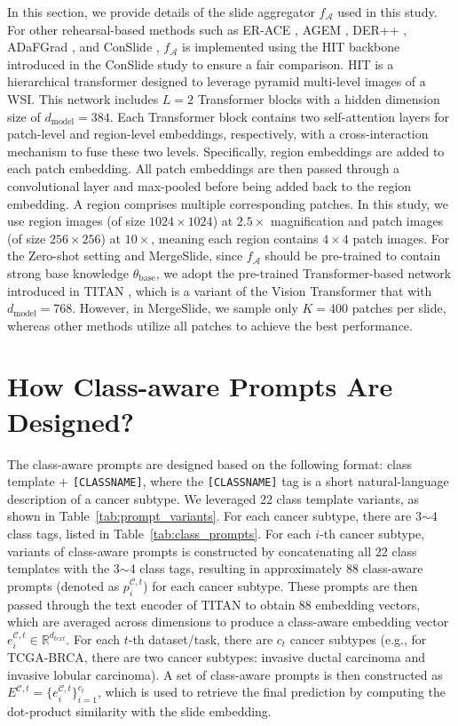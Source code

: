 \documentclass[10pt,twocolumn,letterpaper]{article}
\begin{document}
In this section, we provide details of the slide aggregator $f_{\mathcal{A}}$ used in this study. For other rehearsal-based methods such as ER-ACE \cite{erace}, AGEM \cite{agem}, DER++ \cite{derpp}, ADaFGrad \cite{adafgrad}, and ConSlide \cite{huang2023conslide}, $f_{\mathcal{A}}$ is implemented using the HIT backbone introduced in the ConSlide study \cite{huang2023conslide} to ensure a fair comparison. HIT is a hierarchical transformer designed to leverage pyramid multi-level images of a WSI. This network includes $L = 2$ Transformer blocks with a hidden dimension size of $d_{\text{model}} = 384$. Each Transformer block contains two self-attention layers for patch-level and region-level embeddings, respectively, with a cross-interaction mechanism to fuse these two levels. Specifically, region embeddings are added to each patch embedding. All patch embeddings are then passed through a convolutional layer and max-pooled before being added back to the region embedding. A region comprises multiple corresponding patches. In this study, we use region images (of size $1024\times 1024$) at $2.5\times$ magnification and patch images (of size $256\times 256$) at $10\times$, meaning each region contains $4 \times 4$ patch images. For the Zero-shot setting and MergeSlide, since $f_{\mathcal{A}}$ should be pre-trained to contain strong base knowledge $\theta_{\text{base}}$, we adopt the pre-trained Transformer-based network introduced in TITAN \cite{ding2024multimodal}, which is a variant of the Vision Transformer that with $d_{\text{model}} = 768$. However, in MergeSlide, we sample only $K = 400$ patches per slide, whereas other methods utilize all patches to achieve the best performance.

\section{How Class-aware Prompts Are Designed?}\label{sec:prompts}

{The class-aware prompts are designed based on the following format: class template + \texttt{[CLASSNAME]}, where the \texttt{[CLASSNAME]} tag is a short natural-language description of a cancer subtype. We leveraged 22 class template variants, as shown in Table~\ref{tab:prompt_variants}. For each cancer subtype, there are 3$\sim$4 class tags, listed in Table~\ref{tab:class_prompts}. For each $i$-th cancer subtype, variants of class-aware prompts is constructed by concatenating all 22 class templates with the 3$\sim$4 class tags, resulting in approximately 88 class-aware prompts (denoted as $p^{\mathcal{C},t}_i$) for each cancer subtype. These prompts are then passed through the text encoder of TITAN to obtain 88 embedding vectors, which are averaged across dimensions to produce a class-aware embedding vector $e^{\mathcal{C},t}_i \in \mathbb{R}^{d_{text}}$. For each $t$-th dataset/task, there are $c_t$ cancer subtypes (e.g., for TCGA-BRCA, there are two cancer subtypes: invasive ductal carcinoma and invasive lobular carcinoma). A set of class-aware prompts is then constructed as $E^{\mathcal{C},t} = \{e^{\mathcal{C},t}_i\}^{c_t}_{i=1}$, which is used to retrieve the final prediction by computing the dot-product similarity with the slide embedding.}
\end{document}

